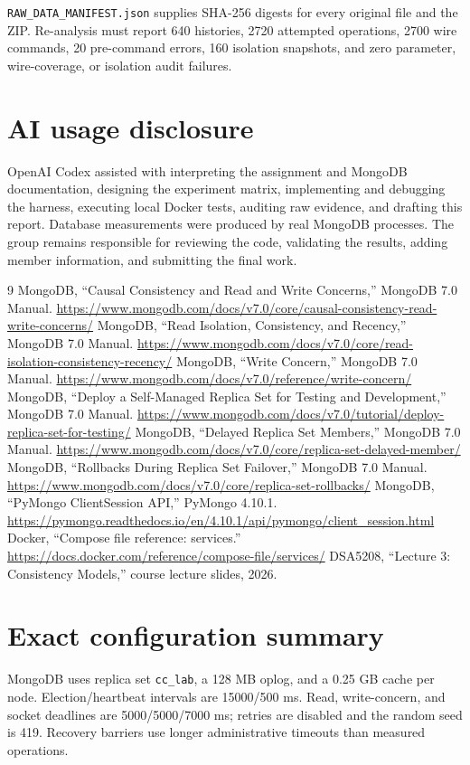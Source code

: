 \documentclass[11pt,a4paper]{article}
\begin{document}
\texttt{RAW\_DATA\_MANIFEST.json} supplies SHA-256 digests for every original file and the
ZIP. Re-analysis must report 640 histories, 2720 attempted operations, 2700 wire commands,
20 pre-command errors, 160 isolation snapshots, and zero parameter, wire-coverage, or
isolation audit failures.

\section{AI usage disclosure}

OpenAI Codex assisted with interpreting the assignment and MongoDB documentation, designing
the experiment matrix, implementing and debugging the harness, executing local Docker tests,
auditing raw evidence, and drafting this report. Database measurements were produced by real
MongoDB processes. The group remains responsible for reviewing the code, validating the
results, adding member information, and submitting the final work.

\begin{thebibliography}{9}
 MongoDB, ``Causal Consistency and Read and Write Concerns,'' MongoDB 7.0 Manual. \url{https://www.mongodb.com/docs/v7.0/core/causal-consistency-read-write-concerns/}
 MongoDB, ``Read Isolation, Consistency, and Recency,'' MongoDB 7.0 Manual. \url{https://www.mongodb.com/docs/v7.0/core/read-isolation-consistency-recency/}
 MongoDB, ``Write Concern,'' MongoDB 7.0 Manual. \url{https://www.mongodb.com/docs/v7.0/reference/write-concern/}
 MongoDB, ``Deploy a Self-Managed Replica Set for Testing and Development,'' MongoDB 7.0 Manual. \url{https://www.mongodb.com/docs/v7.0/tutorial/deploy-replica-set-for-testing/}
 MongoDB, ``Delayed Replica Set Members,'' MongoDB 7.0 Manual. \url{https://www.mongodb.com/docs/v7.0/core/replica-set-delayed-member/}
 MongoDB, ``Rollbacks During Replica Set Failover,'' MongoDB 7.0 Manual. \url{https://www.mongodb.com/docs/v7.0/core/replica-set-rollbacks/}
 MongoDB, ``PyMongo ClientSession API,'' PyMongo 4.10.1. \url{https://pymongo.readthedocs.io/en/4.10.1/api/pymongo/client_session.html}
 Docker, ``Compose file reference: services.'' \url{https://docs.docker.com/reference/compose-file/services/}
 DSA5208, ``Lecture 3: Consistency Models,'' course lecture slides, 2026.
\end{thebibliography}

\appendix
\section{Exact configuration summary}

MongoDB uses replica set \texttt{cc\_lab}, a 128 MB oplog, and a 0.25 GB cache per node.
Election/heartbeat intervals are 15000/500 ms. Read, write-concern, and socket deadlines are
5000/5000/7000 ms; retries are disabled and the random seed is 419. Recovery barriers use
longer administrative timeouts than measured operations.
\end{document}
